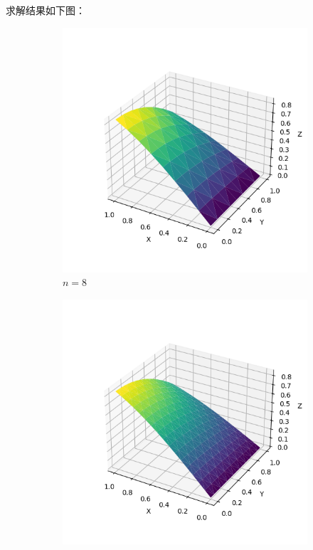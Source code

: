\documentclass[lang=cn,a4paper,newtx,bibend=bibtex]{elegantpaper}
\begin{document}
求解结果如下图：

\begin{figure}[H]
  \centering
  \begin{subfigure}[b]{0.18\textwidth}
      \includegraphics[width=\textwidth]{../../res_bac/res-[data|2-mixed-regular-a8].png}
      \caption{$n =  8$}
  \end{subfigure}
  \hfill
  \begin{subfigure}[b]{0.18\textwidth}
      \includegraphics[width=\textwidth]{../../res_bac/res-[data|2-mixed-regular-b16].png}

\end{subfigure}
\end{figure}
\end{document}
